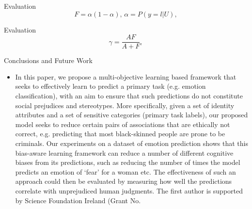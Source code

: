 \documentclass{beamer}
\begin{document}
%
\begin{frame}{Evaluation}
%
\begin{equation}
F=\alpha(1-\alpha),\, \alpha=P(y=l|U),
\end{equation}
\end{frame}
%
\begin{frame}{Evaluation}
%
\begin{equation}
\gamma = \frac{AF}{A+F},    
\end{equation}
\end{frame}
%
\begin{frame}{Conclusions and Future Work}
%
\begin{itemize}
\item
In this paper, we propose a multi-objective learning based framework that seeks to effectively learn to predict a primary task (e.g. emotion classification), with an aim to ensure that such predictions do not constitute social prejudices and stereotypes. More specifically, given a set of identity attributes and a set of sensitive categories (primary task labels), our proposed model seeks to reduce certain pairs of associations that are ethically not correct, e.g. predicting that most black-skinned people are prone to be criminals. Our experiments on a dataset of emotion prediction shows that this bias-aware learning framework can reduce a number of different cognitive biases from its predictions, such as reducing the number of times the model predicts an emotion of `fear' for a woman etc. The effectiveness of such an approach could then be evaluated by measuring how well the predictions correlate with unprejudiced human judgments. The first author is supported by Science Foundation Ireland (Grant No.
\end{itemize}
\end{frame}
%
\end{document}

